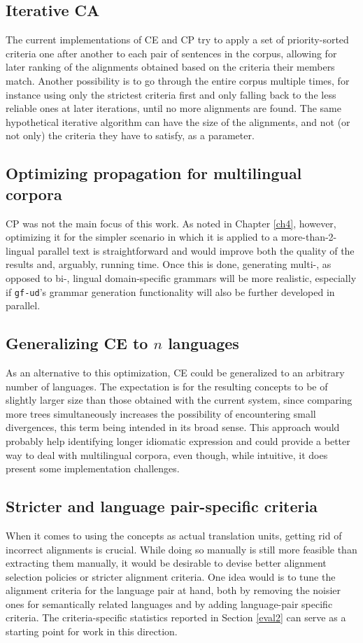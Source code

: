 \subsection*{Iterative CA}
The current implementations of CE and CP try to apply a set of priority-sorted criteria one after another to each pair of sentences in the corpus, allowing for later ranking of the alignments obtained based on the criteria their members match. Another possibility is to go through the entire corpus multiple times, for instance using only the strictest criteria first and only falling back to the less reliable ones at later iterations, until no more alignments are found.
The same hypothetical iterative algorithm can have the size of the alignments, and not (or not only) the criteria they have to satisfy, as a parameter. 

\subsection*{Optimizing propagation for multilingual corpora}
CP was not the main focus of this work. As noted in Chapter \ref{ch4}, however, optimizing it for the simpler scenario in which it is applied to a more-than-2-lingual parallel text is straightforward and would improve both the quality of the results and, arguably, running time. Once this is done, generating multi-, as opposed to bi-, lingual domain-specific grammars will be more realistic, especially if \texttt{gf-ud}'s grammar generation functionality will also be further developed in parallel.

\subsection*{Generalizing CE to $n$ languages}
As an alternative to this optimization, CE could be generalized to an arbitrary number of languages. The expectation is for the resulting concepts to be of slightly larger size than those obtained with the current system, since comparing more trees simultaneously increases the possibility of encountering small divergences, this term being intended in its broad sense. This approach would probably help identifying longer idiomatic expression and could provide a better way to deal with multilingual corpora, even though, while intuitive, it does present some implementation challenges. 

\subsection*{Stricter and language pair-specific criteria} 
When it comes to using the concepts as actual translation units, getting rid of incorrect alignments is crucial. While doing so manually is still more feasible than extracting them manually, it would be desirable to devise better alignment selection policies or stricter alignment criteria. One idea would is to tune the alignment criteria for the language pair at hand, both by removing the noisier ones for semantically related languages and by adding language-pair specific criteria. The criteria-specific statistics reported in Section \ref{eval2} can serve as a starting point for work in this direction.